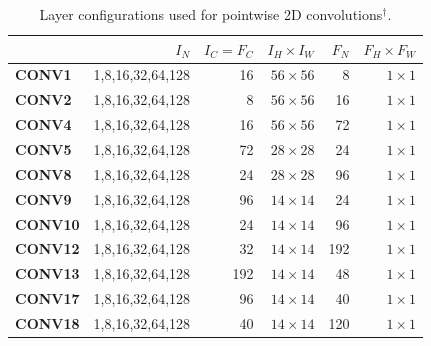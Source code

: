 \begin{table}[]
\caption{Layer configurations used for pointwise 2D convolutions$^{\dag}$.}
\label{tab:pwconv}
\begin{threeparttable}
\begin{tabular}{lrrrrr}
\toprule
& \textbf{$I_N$} & \textbf{$I_C=F_C$} & \textbf{$I_H \times I_W$} & \textbf{$F_N$} & \textbf{$F_H \times F_W$} \\
\midrule
\textbf{CONV1}  & 1,8,16,32,64,128  & 16    & $56\times 56$   & 8   & $1\times 1$\\
\textbf{CONV2}  & 1,8,16,32,64,128  & 8     & $56\times 56$   & 16  & $1\times 1$\\
\textbf{CONV4}  & 1,8,16,32,64,128  & 16    & $56\times 56$   & 72  & $1\times 1$\\
\textbf{CONV5}  & 1,8,16,32,64,128  & 72    & $28\times 28$   & 24  & $1\times 1$\\
\textbf{CONV8}  & 1,8,16,32,64,128  & 24    & $28\times 28$   & 96  & $1\times 1$\\
\textbf{CONV9}  & 1,8,16,32,64,128  & 96    & $14\times 14$   & 24  & $1\times 1$\\
\textbf{CONV10} & 1,8,16,32,64,128  & 24    & $14\times 14$   & 96  & $1\times 1$\\
\textbf{CONV12} & 1,8,16,32,64,128  & 32    & $14\times 14$   & 192 & $1\times 1$\\
\textbf{CONV13} & 1,8,16,32,64,128  & 192   & $14\times 14$   & 48  & $1\times 1$\\
\textbf{CONV17} & 1,8,16,32,64,128  & 96    & $14\times 14$   & 40  & $1\times 1$\\
\textbf{CONV18} & 1,8,16,32,64,128  & 40    & $14\times 14$   & 120 & $1\times 1$\\

\end{tabular}
\end{threeparttable}
\end{table}
